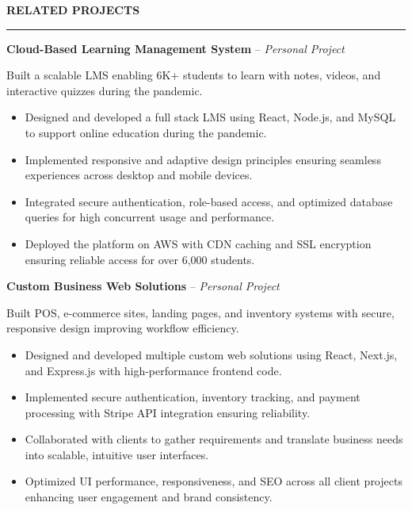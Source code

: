 \documentclass[10pt,letterpaper]{article}
\begin{document}
\vspace{6pt}

\textbf{RELATED PROJECTS}\\[-8pt]
\noindent\rule{\textwidth}{1pt}

\vspace{-2pt}

\textbf{Cloud-Based Learning Management System} -- \emph{Personal Project}

\vspace{-1pt}

Built a scalable LMS enabling 6K+ students to learn with notes, videos, and interactive quizzes during the pandemic.
\vspace{-1pt}
\begin{itemize}
\item Designed and developed a full stack LMS using React, Node.js, and MySQL to support online education during the pandemic.
\item Implemented responsive and adaptive design principles ensuring seamless experiences across desktop and mobile devices.
\item Integrated secure authentication, role-based access, and optimized database queries for high concurrent usage and performance.
\item Deployed the platform on AWS with CDN caching and SSL encryption ensuring reliable access for over 6,000 students.
\end{itemize}

\textbf{Custom Business Web Solutions} -- \emph{Personal Project}

\vspace{-1pt}

Built POS, e-commerce sites, landing pages, and inventory systems with secure, responsive design improving workflow efficiency.
\vspace{-1pt}
\begin{itemize}
\item Designed and developed multiple custom web solutions using React, Next.js, and Express.js with high-performance frontend code.
\item Implemented secure authentication, inventory tracking, and payment processing with Stripe API integration ensuring reliability.
\item Collaborated with clients to gather requirements and translate business needs into scalable, intuitive user interfaces.
\item Optimized UI performance, responsiveness, and SEO across all client projects enhancing user engagement and brand consistency.
\end{itemize}
\end{document}
